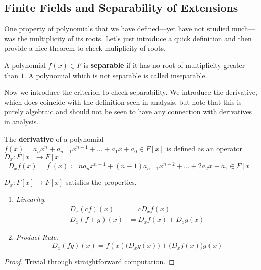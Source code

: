 \subsection{Finite Fields and Separability of Extensions} 

  One property of polynomials that we have defined---yet have not studied much---was the multiplicity of its roots. Let's just introduce a quick definition and then provide a nice theorem to check muliplicity of roots.  

  \begin{definition}
    A polynomial $f(x) \in F$ is \textbf{separable} if it has no root of multiplicity greater than $1$. A polynomial which is not separable is called inseparable. 
  \end{definition}

  Now we introduce the criterion to check separability. We introduce the derivative, which does coincide with the definition seen in analysis, but note that this is purely algebraic and should not be seen to have any connection with derivatives in analysis.  

  \begin{definition}[Derivative]
    The \textbf{derivative} of a polynomial $f(x) = a_n x^n + a_{n-1} x^{n-1} + \ldots + a_1 x + a_0 \in F[x]$ is defined as an operator $D_x : F[x] \to F[x]$ 
    \begin{equation}
      D_x f(x) = f^\prime (x) \coloneqq n a_n x^{n-1} + (n-1) a_{n-1} x^{n-2} + \ldots + 2 a_2 x + a_1 \in F[x] 
    \end{equation}
  \end{definition}

  \begin{lemma}
    $D_x: F[x] \to F[x]$ satisfies the properties. 
    \begin{enumerate}
      \item \textit{Linearity}. 
        \begin{align}
          D_x (cf)(x) & = c D_x f(x) \\
          D_x (f + g)(x) & = D_x f(x) + D_x g(x) 
        \end{align}

      \item \textit{Product Rule}. 
        \begin{equation}
          D_x (fg)(x) = f(x) \big( D_x g(x) \big) + \big( D_x f(x) \big) g(x)
        \end{equation}
    \end{enumerate}
  \end{lemma}
  \begin{proof}
    Trivial through straightforward computation. 
  \end{proof}

